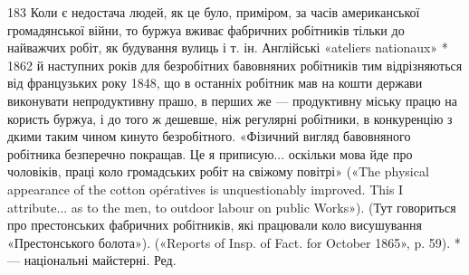 183    Коли є недостача людей, як це було, приміром, за часів американської
громадянської війни, то буржуа вживає фабричних робітників
тільки до найважчих робіт, як будування вулиць і т. ін. Англійські
«ateliers nationaux» * 1862 й наступних років для безробітних бавовняних
робітників тим відрізняються від французьких року 1848, що в останніх
робітник мав на кошти держави виконувати непродуктивну прашо, в
перших же — продуктивну міську працю на користь буржуа, і до того ж
дешевше, ніж регулярні робітники, в конкуренцію з дкими таким чином
кинуто безробітного. «Фізичний вигляд бавовняного робітника безперечно
покращав. Це я приписую... оскільки мова йде про чоловіків, праці
коло громадських робіт на свіжому повітрі» («The physical appearance
of the cotton opératives is unquestionably improved. This I attribute...
as to the men, to outdoor labour on public Works»). (Тут говориться
про престонських фабричних робітників, які працювали коло висушування
«Престонського болота»). («Reports of Insp. of Fact. for October
1865», p. 59).
* — національні майстерні. Ред.
